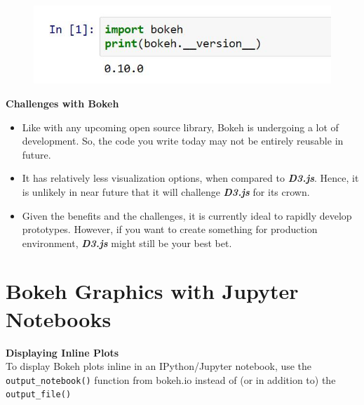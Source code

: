 \documentclass[a4paper,12pt]{article}
\begin{document}
\begin{figure}[h!]
	\centering
	\includegraphics[width=0.9\linewidth]{images/00-BOKEH-version-check}
\end{figure}
\newpage
\begin{framed}
	\noindent \textbf{Challenges with Bokeh}
	\begin{itemize}
		\item Like with any upcoming open source library, Bokeh is undergoing a lot of development. So, the code you write today may not be entirely reusable in future.
		
		\item  It has relatively less visualization options, when compared to \textbf{\textit{D3.js}}. Hence, it is unlikely in near future that it will challenge \textbf{\textit{D3.js}} for its crown.
		\item  Given the benefits and the challenges, it is currently ideal to rapidly develop prototypes. However, if you want to create something for production environment, \textbf{\textit{D3.js}} might still be your best bet.
	\end{itemize}
\end{framed}
\newpage
\section*{Bokeh Graphics with Jupyter Notebooks}

\begin{framed}
\noindent \textbf{Displaying Inline Plots}\\ 
To display Bokeh plots inline in an IPython/Jupyter notebook, use the \texttt{output\_notebook()} function from bokeh.io instead of (or in addition to) the \texttt{output\_file()}
\end{framed}
\end{document}
